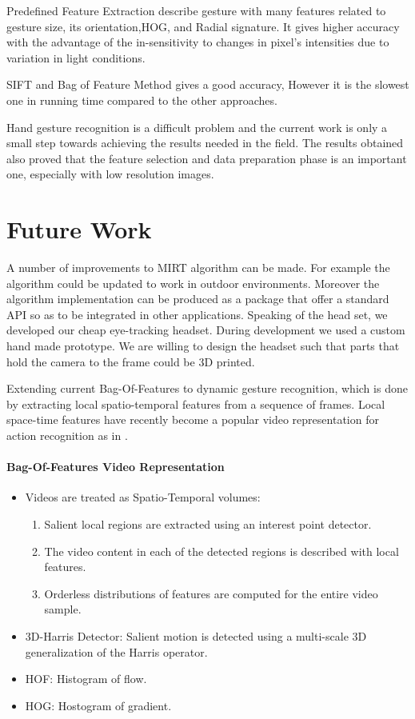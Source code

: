 Predefined Feature Extraction describe gesture with many features related to gesture size, its orientation,HOG, and Radial signature. It gives higher accuracy with the advantage of the in-sensitivity to changes in pixel's intensities due to variation in light conditions.\bigskip

SIFT and Bag of Feature Method gives a good accuracy, However it is the slowest one in running time compared to the other approaches.\bigskip

Hand gesture recognition is a difficult problem and the current work is only a small step towards achieving the results needed in the field. The results obtained also proved that the feature selection and data preparation phase is an important one, especially with low resolution images. \bigskip


\section{Future Work} 
A number of improvements to MIRT algorithm can be made. For example the algorithm could be updated to work in outdoor environments. Moreover the algorithm implementation can be produced as a package that offer a standard API so as to be integrated in other applications. Speaking of the head set, we developed our cheap eye-tracking headset. During development we used a custom hand made prototype. We are willing to design the headset such that parts that hold the camera to the frame could be 3D printed. \bigskip

Extending current Bag-Of-Features to dynamic gesture recognition, which is done by extracting local spatio-temporal features from a sequence of frames. Local space-time features have recently become a popular video representation for action recognition as in \cite{future}.

\paragraph{Bag-Of-Features Video Representation}
\begin{itemize}
\item Videos are treated as Spatio-Temporal volumes:
\begin{enumerate}
\item Salient local regions are extracted using an interest point detector.
\item The video content in each of the detected regions is described with local features.
\item Orderless distributions of features are computed for the entire video sample.
\end{enumerate}
 \bigskip
\item 3D-Harris Detector: Salient motion is detected using a multi-scale 3D generalization of the Harris operator.
\item HOF: Histogram of flow.
\item HOG: Hostogram of gradient.
\end{itemize}

